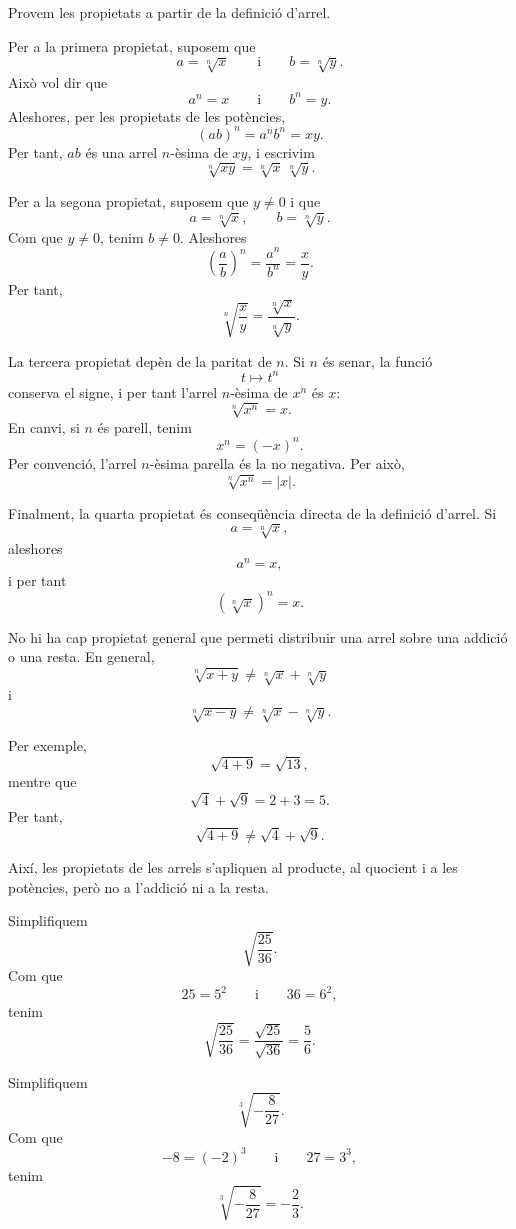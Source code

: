 \begin{prova}
Provem les propietats a partir de la definició d'arrel.

Per a la primera propietat, suposem que
\[
	a=\sqrt[n]{x}
	\qquad\text{i}\qquad
	b=\sqrt[n]{y}.
\]
Això vol dir que
\[
	a^n=x
	\qquad\text{i}\qquad
	b^n=y.
\]
Aleshores, per les propietats de les potències,
\[
	(ab)^n=a^n b^n=xy.
\]
Per tant, \(ab\) és una arrel \(n\)-èsima de \(xy\), i escrivim
\[
	\sqrt[n]{xy}=\sqrt[n]{x}\,\sqrt[n]{y}.
\]

Per a la segona propietat, suposem que \(y\neq0\) i que
\[
	a=\sqrt[n]{x},
	\qquad
	b=\sqrt[n]{y}.
\]
Com que \(y\neq0\), tenim \(b\neq0\). Aleshores
\[
	\left(\frac{a}{b}\right)^n
	=
	\frac{a^n}{b^n}
	=
	\frac{x}{y}.
\]
Per tant,
\[
	\sqrt[n]{\frac{x}{y}}
	=
	\frac{\sqrt[n]{x}}{\sqrt[n]{y}}.
\]

La tercera propietat depèn de la paritat de \(n\). Si \(n\) és senar, la funció
\[
	t\longmapsto t^n
\]
conserva el signe, i per tant l'arrel \(n\)-èsima de \(x^n\) és \(x\):
\[
	\sqrt[n]{x^n}=x.
\]
En canvi, si \(n\) és parell, tenim
\[
	x^n=(-x)^n.
\]
Per convenció, l'arrel \(n\)-èsima parella és la no negativa. Per això,
\[
	\sqrt[n]{x^n}=|x|.
\]

Finalment, la quarta propietat és conseqüència directa de la definició d'arrel. Si
\[
	a=\sqrt[n]{x},
\]
aleshores
\[
	a^n=x,
\]
i per tant
\[
	\left(\sqrt[n]{x}\right)^n=x.
\]
\end{prova}

\begin{observacio}
No hi ha cap propietat general que permeti distribuir una arrel sobre una addició o una resta. En general,
\[
	\sqrt[n]{x+y}\neq \sqrt[n]{x}+\sqrt[n]{y}
\]
i
\[
	\sqrt[n]{x-y}\neq \sqrt[n]{x}-\sqrt[n]{y}.
\]

Per exemple,
\[
	\sqrt{4+9}=\sqrt{13},
\]
mentre que
\[
	\sqrt{4}+\sqrt{9}=2+3=5.
\]
Per tant,
\[
	\sqrt{4+9}\neq \sqrt{4}+\sqrt{9}.
\]

Així, les propietats de les arrels s'apliquen al producte, al quocient i a les potències, però no a l'addició ni a la resta.
\end{observacio}

\begin{exemple}
Simplifiquem
\[
	\sqrt{\frac{25}{36}}.
\]
Com que
\[
	25=5^2
	\qquad\text{i}\qquad
	36=6^2,
\]
tenim
\[
	\sqrt{\frac{25}{36}}
	=
	\frac{\sqrt{25}}{\sqrt{36}}
	=
	\frac{5}{6}.
\]
\end{exemple}

\begin{exemple}
Simplifiquem
\[
	\sqrt[3]{-\frac{8}{27}}.
\]
Com que
\[
	-8=(-2)^3
	\qquad\text{i}\qquad
	27=3^3,
\]
tenim
\[
	\sqrt[3]{-\frac{8}{27}}
	=
	-\frac{2}{3}.
\]
\end{exemple}

